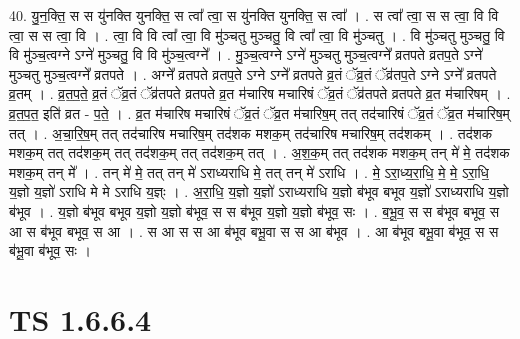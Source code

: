 \documentclass[17pt]{extarticle}
\begin{document}
40. यु॒न॒क्ति॒ स स यु॑नक्ति युनक्ति॒ स त्वा᳚ त्वा॒ स यु॑नक्ति युनक्ति॒ स त्वा᳚ । . स त्वा᳚ त्वा॒ स स त्वा॒ वि वि त्वा॒ स स त्वा॒ वि । . त्वा॒ वि वि त्वा᳚ त्वा॒ वि मु॑ञ्चतु मुञ्चतु॒ वि त्वा᳚ त्वा॒ वि मु॑ञ्चतु । . वि मु॑ञ्चतु मुञ्चतु॒ वि वि मु॑ञ्च॒त्वग्ने ऽग्ने॑ मुञ्चतु॒ वि वि मु॑ञ्च॒त्वग्ने᳚ । . मु॒ञ्च॒त्वग्ने ऽग्ने॑ मुञ्चतु मुञ्च॒त्वग्ने᳚ व्रतपते व्रतप॒ते ऽग्ने॑ मुञ्चतु मुञ्च॒त्वग्ने᳚ व्रतपते । . अग्ने᳚ व्रतपते व्रतप॒ते ऽग्ने ऽग्ने᳚ व्रतपते व्र॒तं ॅव्र॒तं ॅव्र॑तप॒ते ऽग्ने ऽग्ने᳚ व्रतपते व्र॒तम् । . व्र॒त॒प॒ते॒ व्र॒तं ॅव्र॒तं ॅव्र॑तपते व्रतपते व्र॒त म॑चारिष मचारिषं ॅव्र॒तं ॅव्र॑तपते व्रतपते व्र॒त म॑चारिषम् । . व्र॒त॒प॒त॒ इति॑ व्रत - प॒ते॒ । . व्र॒त म॑चारिष मचारिषं ॅव्र॒तं ॅव्र॒त म॑चारिष॒म् तत् तद॑चारिषं ॅव्र॒तं ॅव्र॒त म॑चारिष॒म् तत् । . अ॒चा॒रि॒ष॒म् तत् तद॑चारिष मचारिष॒म् तद॑शक मशक॒म् तद॑चारिष मचारिष॒म् तद॑शकम् । . तद॑शक मशक॒म् तत् तद॑शक॒म् तत् तद॑शक॒म् तत् तद॑शक॒म् तत् । . अ॒श॒क॒म् तत् तद॑शक मशक॒म् तन् मे॑ मे॒ तद॑शक मशक॒म् तन् मे᳚ । . तन् मे॑ मे॒ तत् तन् मे॑ ऽराध्यराधि मे॒ तत् तन् मे॑ ऽराधि । . मे॒ ऽरा॒ध्य॒रा॒धि॒ मे॒ मे॒ ऽरा॒धि॒ य॒ज्ञो य॒ज्ञो॑ ऽराधि मे मे ऽराधि य॒ज्ञ्ः । . अ॒रा॒धि॒ य॒ज्ञो य॒ज्ञो॑ ऽराध्यराधि य॒ज्ञो ब॑भूव बभूव य॒ज्ञो॑ ऽराध्यराधि य॒ज्ञो ब॑भूव । . य॒ज्ञो ब॑भूव बभूव य॒ज्ञो य॒ज्ञो ब॑भूव॒ स स ब॑भूव य॒ज्ञो य॒ज्ञो ब॑भूव॒ सः । . ब॒भू॒व॒ स स ब॑भूव बभूव॒ स आ स ब॑भूव बभूव॒ स आ । . स आ स स आ ब॑भूव बभू॒वा स स आ ब॑भूव । . आ ब॑भूव बभू॒वा ब॑भूव॒ स स ब॑भू॒वा ब॑भूव॒ सः । \newline
\pagebreak
{}

\section{ TS 1.6.6.4 }
\end{document}
